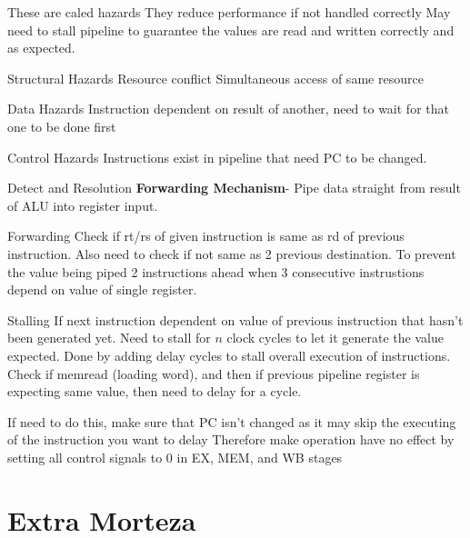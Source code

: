 \documentclass{article}
\begin{document}
		These are caled hazards
		They reduce performance if not handled correctly
		May need to stall pipeline to guarantee the values are read and written correctly and as expected.


		Structural Hazards
			Resource conflict
			Simultaneous access of same resource

		Data Hazards
			Instruction dependent on result of another, need to wait for that one to be done first

		Control Hazards
			Instructions exist in pipeline that need PC to be changed.

		Detect and Resolution
			\textbf{Forwarding Mechanism}- Pipe data straight from result of ALU into register input.

			Forwarding
				Check if rt/rs of given instruction is same as rd of previous instruction.
				Also need to check if not same as 2 previous destination. To prevent the value being piped 2 instructions ahead when 3 consecutive instrustions depend on value of single register.

			Stalling
				If next instruction dependent on value of previous instruction that hasn't been generated yet. 
				Need to stall for $n$ clock cycles to let it generate the value expected. 
				Done by adding delay cycles to stall overall execution of instructions.
				Check if memread (loading word), and then if previous pipeline register is expecting same value, then need to delay for a cycle.

				If need to do this, make sure that PC isn't changed as it may skip the executing of the instruction you want to delay
				Therefore make operation have no effect by setting all control signals to 0 in EX, MEM, and WB stages






\section{Extra Morteza}
\end{document}
